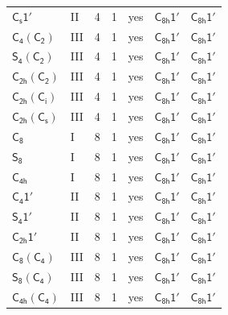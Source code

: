 \documentclass[10pt,a4paper]{article}
\numberwithin{equation}{section}
\newcommand{\grp}[1]{\mathsf{#1}}
\begin{document}
{\begin{longtable}{@{}llrrlll@{}}
\href{C1v-1p.pdf}{$\grp{C_{s}1'}$} & II & 4 & 1 & yes & \href{C8h-1p.pdf}{$\grp{C_{8h}1'}$} & \href{C8h-1p.pdf}{$\grp{C_{8h}1'}$}\\
\href{C4-C2.pdf}{$\grp{C_{4}}(\grp{C_{2}})$} & III & 4 & 1 & yes & \href{C8h-1p.pdf}{$\grp{C_{8h}1'}$} & \href{C8h-1p.pdf}{$\grp{C_{8h}1'}$}\\
\href{S4-C2.pdf}{$\grp{S_{4}}(\grp{C_{2}})$} & III & 4 & 1 & yes & \href{C8h-1p.pdf}{$\grp{C_{8h}1'}$} & \href{C8h-1p.pdf}{$\grp{C_{8h}1'}$}\\
\href{C2h-C2.pdf}{$\grp{C_{2h}}(\grp{C_{2}})$} & III & 4 & 1 & yes & \href{C8h-1p.pdf}{$\grp{C_{8h}1'}$} & \href{C8h-1p.pdf}{$\grp{C_{8h}1'}$}\\
\href{C2h-S2.pdf}{$\grp{C_{2h}}(\grp{C_{i}})$} & III & 4 & 1 & yes & \href{C8h-1p.pdf}{$\grp{C_{8h}1'}$} & \href{C8h-1p.pdf}{$\grp{C_{8h}1'}$}\\
\href{C2h-C1v.pdf}{$\grp{C_{2h}}(\grp{C_{s}})$} & III & 4 & 1 & yes & \href{C8h-1p.pdf}{$\grp{C_{8h}1'}$} & \href{C8h-1p.pdf}{$\grp{C_{8h}1'}$}\\
\href{../../../rotation/data/pdf/C8.pdf}{$\grp{C_{8}}$} & I & 8 & 1 & yes & \href{C8h-1p.pdf}{$\grp{C_{8h}1'}$} & \href{C8h-1p.pdf}{$\grp{C_{8h}1'}$}\\
\href{../../../rotation/data/pdf/S8.pdf}{$\grp{S_{8}}$} & I & 8 & 1 & yes & \href{C8h-1p.pdf}{$\grp{C_{8h}1'}$} & \href{C8h-1p.pdf}{$\grp{C_{8h}1'}$}\\
\href{../../../rotation/data/pdf/C4h.pdf}{$\grp{C_{4h}}$} & I & 8 & 1 & yes & \href{C8h-1p.pdf}{$\grp{C_{8h}1'}$} & \href{C8h-1p.pdf}{$\grp{C_{8h}1'}$}\\
\href{C4-1p.pdf}{$\grp{C_{4}1'}$} & II & 8 & 1 & yes & \href{C8h-1p.pdf}{$\grp{C_{8h}1'}$} & \href{C8h-1p.pdf}{$\grp{C_{8h}1'}$}\\
\href{S4-1p.pdf}{$\grp{S_{4}1'}$} & II & 8 & 1 & yes & \href{C8h-1p.pdf}{$\grp{C_{8h}1'}$} & \href{C8h-1p.pdf}{$\grp{C_{8h}1'}$}\\
\href{C2h-1p.pdf}{$\grp{C_{2h}1'}$} & II & 8 & 1 & yes & \href{C8h-1p.pdf}{$\grp{C_{8h}1'}$} & \href{C8h-1p.pdf}{$\grp{C_{8h}1'}$}\\
\href{C8-C4.pdf}{$\grp{C_{8}}(\grp{C_{4}})$} & III & 8 & 1 & yes & \href{C8h-1p.pdf}{$\grp{C_{8h}1'}$} & \href{C8h-1p.pdf}{$\grp{C_{8h}1'}$}\\
\href{S8-C4.pdf}{$\grp{S_{8}}(\grp{C_{4}})$} & III & 8 & 1 & yes & \href{C8h-1p.pdf}{$\grp{C_{8h}1'}$} & \href{C8h-1p.pdf}{$\grp{C_{8h}1'}$}\\
\href{C4h-C4.pdf}{$\grp{C_{4h}}(\grp{C_{4}})$} & III & 8 & 1 & yes & \href{C8h-1p.pdf}{$\grp{C_{8h}1'}$} & \href{C8h-1p.pdf}{$\grp{C_{8h}1'}$}\\

\end{longtable}}
\end{document}
